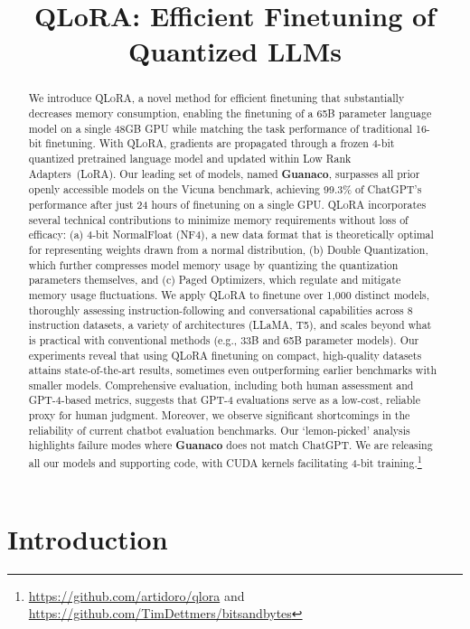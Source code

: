 \title{QLoRA: Efficient Finetuning of Quantized LLMs}

\begin{abstract}
We introduce \textsc{QLoRA}, a novel method for efficient finetuning that substantially decreases memory consumption, enabling the finetuning of a 65B parameter language model on a single 48GB GPU while matching the task performance of traditional 16-bit finetuning. With \textsc{QLoRA}, gradients are propagated through a frozen 4-bit quantized pretrained language model and updated within Low Rank Adapters~(LoRA). Our leading set of models, named \textbf{Guanaco}, surpasses all prior openly accessible models on the Vicuna benchmark, achieving 99.3\% of ChatGPT’s performance after just 24 hours of finetuning on a single GPU. \textsc{QLoRA} incorporates several technical contributions to minimize memory requirements without loss of efficacy: (a) 4-bit NormalFloat (NF4), a new data format that is theoretically optimal for representing weights drawn from a normal distribution, (b) Double Quantization, which further compresses model memory usage by quantizing the quantization parameters themselves, and (c) Paged Optimizers, which regulate and mitigate memory usage fluctuations. We apply \textsc{QLoRA} to finetune over 1,000 distinct models, thoroughly assessing instruction-following and conversational capabilities across 8 instruction datasets, a variety of architectures (LLaMA, T5), and scales beyond what is practical with conventional methods (e.g., 33B and 65B parameter models). Our experiments reveal that using QLoRA finetuning on compact, high-quality datasets attains state-of-the-art results, sometimes even outperforming earlier benchmarks with smaller models. Comprehensive evaluation, including both human assessment and GPT-4-based metrics, suggests that GPT-4 evaluations serve as a low-cost, reliable proxy for human judgment. Moreover, we observe significant shortcomings in the reliability of current chatbot evaluation benchmarks. Our ‘lemon-picked’ analysis highlights failure modes where \textbf{Guanaco} does not match ChatGPT. We are releasing all our models and supporting code, with CUDA kernels facilitating 4-bit training.\footnote{\url{https://github.com/artidoro/qlora} and \url{https://github.com/TimDettmers/bitsandbytes}}
\end{abstract}

\section{Introduction}

